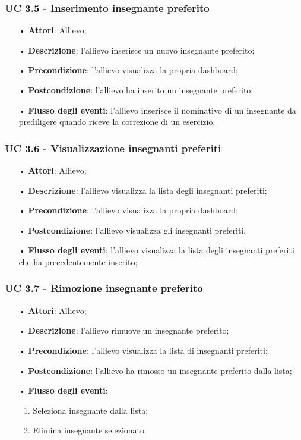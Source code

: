 \subsubsection{UC 3.5 - Inserimento insegnante preferito}
\begin{itemize}
\item[•]\textbf{Attori}: Allievo;
\item[•]\textbf{Descrizione}: l'allievo inserisce un nuovo insegnante preferito;
\item[•]\textbf{Precondizione}: l'allievo visualizza la propria dashboard;
\item[•]\textbf{Postcondizione}: l'allievo ha inserito un insegnante preferito;
\item[•]\textbf{Flusso degli eventi}: l'allievo inserisce il nominativo di un insegnante da prediligere quando riceve la correzione di un esercizio.
\end{itemize}

\subsubsection{UC 3.6 - Visualizzazione insegnanti preferiti}
\begin{itemize}
	\item[•]\textbf{Attori}: Allievo;
	\item[•]\textbf{Descrizione}: l'allievo visualizza la lista degli insegnanti preferiti;
	\item[•]\textbf{Precondizione}: l'allievo visualizza la propria dashboard;
	\item[•]\textbf{Postcondizione}: l'allievo visualizza gli insegnanti preferiti.
	\item[•]\textbf{Flusso degli eventi}: l'allievo visualizza la lista degli insegnanti preferiti che ha precedentemente inserito;
\end{itemize}

\subsubsection{UC 3.7 - Rimozione insegnante preferito}
\begin{itemize}
	\item[•]\textbf{Attori}: Allievo;
	\item[•]\textbf{Descrizione}: l'allievo rimuove un insegnante preferito;
	\item[•]\textbf{Precondizione}: l'allievo visualizza la lista di insegnanti preferiti;
	\item[•]\textbf{Postcondizione}: l'allievo ha rimosso un insegnante preferito dalla lista;
	\item[•]\textbf{Flusso degli eventi}: 
	\begin{enumerate}
	 \item Seleziona insegnante dalla lista;
	 \item Elimina insegnante selezionato.
	\end{enumerate}
\end{itemize}

